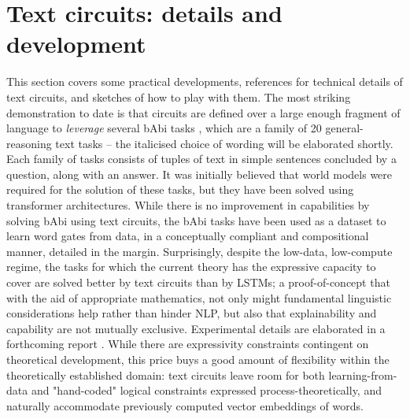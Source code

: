 \section{Text circuits: details and development}\label{sec:circs}


This section covers some practical developments, references for technical details of text circuits, and sketches of how to play with them. The most striking demonstration to date is that circuits are defined over a large enough fragment of language to \emph{leverage} several bAbi tasks \citep{BAbIMetaResearch}, which are a family of 20 general-reasoning text tasks -- the italicised choice of wording will be elaborated shortly. Each family of tasks consists of tuples of text in simple sentences concluded by a question, along with an answer. It was initially believed that world models were required for the solution of these tasks, but they have been solved using transformer architectures. While there is no improvement in capabilities by solving bAbi using text circuits, the bAbi tasks have been used as a dataset to learn word gates from data, in a conceptually compliant and compositional manner, detailed in the margin. Surprisingly, despite the low-data, low-compute regime, the tasks for which the current theory has the expressive capacity to cover are solved better by text circuits than by LSTMs; a proof-of-concept that with the aid of appropriate mathematics, not only might fundamental linguistic considerations help rather than hinder NLP, but also that explainability and capability are not mutually exclusive. Experimental details are elaborated in a forthcoming report \citep{anonymousquantinuumresearchersDisCoCircCompositionalDiscource}. While there are expressivity constraints contingent on theoretical development, this price buys a good amount of flexibility within the theoretically established domain: text circuits leave room for both learning-from-data and "hand-coded" logical constraints expressed process-theoretically, and naturally accommodate previously computed vector embeddings of words.\\

